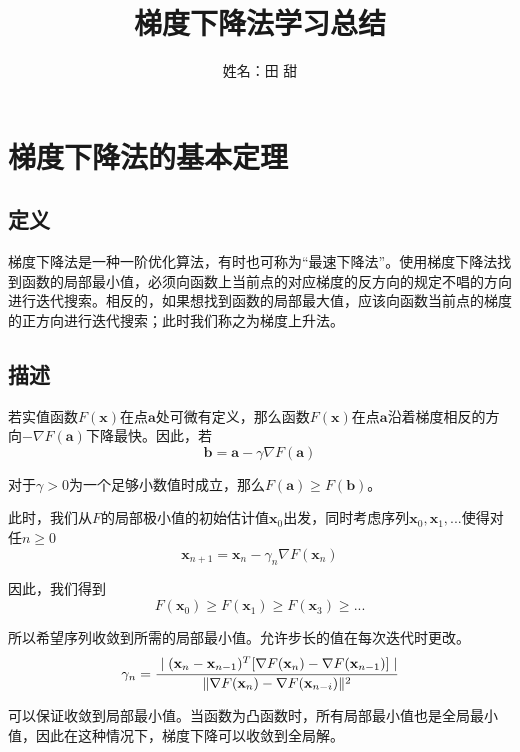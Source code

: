 \documentclass[12pt,a4paper]{article}
\title{梯度下降法学习总结}
\author{姓名：田  甜}
\date{\chntoday}
\begin{document}
\maketitle
\newpage
\section{梯度下降法的基本定理}
\subsection{定义}
梯度下降法是一种一阶优化算法，有时也可称为“最速下降法”。使用梯度下降法找到函数的局部最小值，必须向函数上当前点的对应梯度的反方向的规定不唱的方向进行迭代搜索。相反的，如果想找到函数的局部最大值，应该向函数当前点的梯度的正方向进行迭代搜索；此时我们称之为梯度上升法。

\subsection{描述}
若实值函数$F(\mathbf x)$在点$\mathbf a$处可微有定义，那么函数$F(\mathbf x)$在点$\mathbf a$沿着梯度相反的方向$-\nabla F(\mathbf a)$下降最快。因此，若
\begin{equation}
\mathbf b=\mathbf a-\gamma\nabla F(\mathbf a)
\end{equation}

对于$\gamma>0$为一个足够小数值时成立，那么$F(\mathbf a)\ge F(\mathbf b)$。

此时，我们从$F$的局部极小值的初始估计值$\mathbf x_0$出发，同时考虑序列$\mathbf x_0,\mathbf x_1,...$使得对任$n\ge 0$
\begin{equation}
	\mathbf x_{n+1}=\mathbf x_n-\gamma_n\nabla F(\mathbf x_n)
\end{equation}

因此，我们得到
$$F(\mathbf x_0)\ge F(\mathbf x_1)\ge F(\mathbf x_3)\ge ...$$

所以希望序列收敛到所需的局部最小值。允许步长的值在每次迭代时更改。
\begin{equation}
	\gamma_n=\cfrac{\mid (\mathbf x_n-\mathbf x_{n-1})^T[\nabla F(\mathbf x_n)-\nabla F(\mathbf x_{n-1})]\mid }{\| \nabla F(\mathbf x_n)-\nabla F(\mathbf x_{n-i}) \|^2}
\end{equation}

可以保证收敛到局部最小值。当函数为凸函数时，所有局部最小值也是全局最小值，因此在这种情况下，梯度下降可以收敛到全局解。
\end{document}

